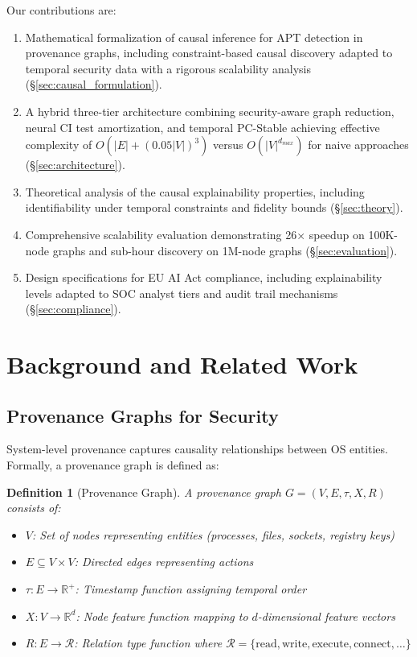 \documentclass[conference]{IEEEtran}
\newtheorem{definition}{Definition}
\begin{document}
Our contributions are:

\begin{enumerate}
    \item Mathematical formalization of causal inference for APT detection in provenance graphs, including constraint-based causal discovery adapted to temporal security data with a rigorous scalability analysis (\S\ref{sec:causal_formulation}).
    
    \item A hybrid three-tier architecture combining security-aware graph reduction, neural CI test amortization, and temporal PC-Stable achieving effective complexity of $O(|E| + (0.05|V|)^3)$ versus $O(|V|^{d_{max}})$ for naive approaches (\S\ref{sec:architecture}).
    
    \item Theoretical analysis of the causal explainability properties, including identifiability under temporal constraints and fidelity bounds (\S\ref{sec:theory}).
    
    \item Comprehensive scalability evaluation demonstrating 26× speedup on 100K-node graphs and sub-hour discovery on 1M-node graphs (\S\ref{sec:evaluation}).
    
    \item Design specifications for EU AI Act compliance, including explainability levels adapted to SOC analyst tiers and audit trail mechanisms (\S\ref{sec:compliance}).
\end{enumerate}

\section{Background and Related Work}

\subsection{Provenance Graphs for Security}

System-level provenance captures causality relationships between OS entities. Formally, a provenance graph is defined as:

\begin{definition}[Provenance Graph]
A provenance graph $G = (V, E, \tau, X, R)$ consists of:
\begin{itemize}
    \item $V$: Set of nodes representing entities (processes, files, sockets, registry keys)
    \item $E \subseteq V \times V$: Directed edges representing actions
    \item $\tau: E \rightarrow \mathbb{R}^+$: Timestamp function assigning temporal order
    \item $X: V \rightarrow \mathbb{R}^d$: Node feature function mapping to $d$-dimensional feature vectors
    \item $R: E \rightarrow \mathcal{R}$: Relation type function where $\mathcal{R} = \{\text{read}, \text{write}, \text{execute}, \text{connect}, \ldots\}$
\end{itemize}
\end{definition}
\end{document}
